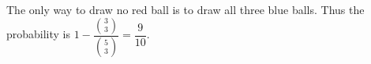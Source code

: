 The only way to draw no red ball is to draw all three blue balls. Thus the probability is $1-\dfrac{\binom33}{\binom53}=\boxed{\dfrac{9}{10}}$.
